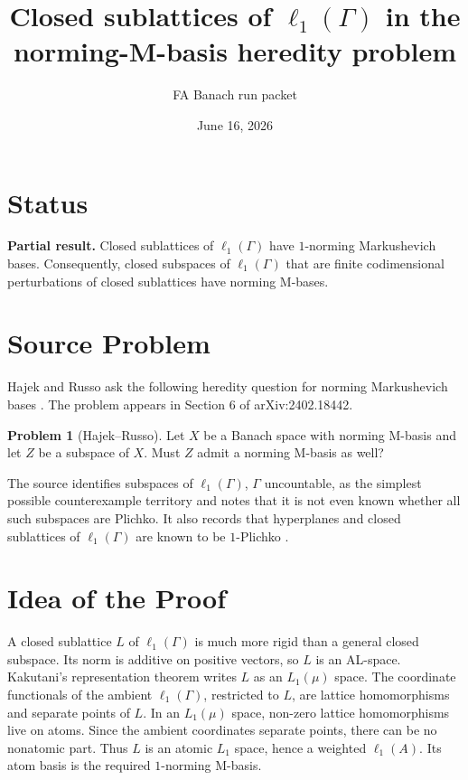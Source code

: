 \documentclass[11pt]{amsart}
\title{Closed sublattices of \(\ell_1(\Gamma)\) in the norming-M-basis heredity problem}
\author{FA Banach run packet}
\date{June 16, 2026}
\theoremstyle{definition}
\newtheorem{problem}{Problem}
\begin{document}
\maketitle

\section*{Status}

\textbf{Partial result.}
Closed sublattices of \(\ell_1(\Gamma)\) have \(1\)-norming Markushevich
bases. Consequently, closed subspaces of \(\ell_1(\Gamma)\) that are finite
codimensional perturbations of closed sublattices have norming M-bases.

\section*{Source Problem}

Hajek and Russo ask the following heredity question for norming
Markushevich bases \cite[Problem 6.1]{HR}. The problem appears in
Section 6 of arXiv:2402.18442.

\begin{problem}[Hajek--Russo]
Let \(X\) be a Banach space with norming M-basis and let \(Z\) be a
subspace of \(X\). Must \(Z\) admit a norming M-basis as well?
\end{problem}

The source identifies subspaces of \(\ell_1(\Gamma)\), \(\Gamma\)
uncountable, as the simplest possible counterexample territory and notes
that it is not even known whether all such subspaces are Plichko. It also
records that hyperplanes and closed sublattices of \(\ell_1(\Gamma)\) are
known to be \(1\)-Plichko \cite[Section 6]{HR}.

\section*{Idea of the Proof}

A closed sublattice \(L\) of \(\ell_1(\Gamma)\) is much more rigid than a
general closed subspace. Its norm is additive on positive vectors, so \(L\)
is an AL-space. Kakutani's representation theorem writes \(L\) as an
\(L_1(\mu)\) space. The coordinate functionals of the ambient
\(\ell_1(\Gamma)\), restricted to \(L\), are lattice homomorphisms and
separate points of \(L\). In an \(L_1(\mu)\) space, non-zero lattice
homomorphisms live on atoms. Since the ambient coordinates separate points,
there can be no nonatomic part. Thus \(L\) is an atomic \(L_1\) space,
hence a weighted \(\ell_1(A)\). Its atom basis is the required
\(1\)-norming M-basis.
\end{document}
